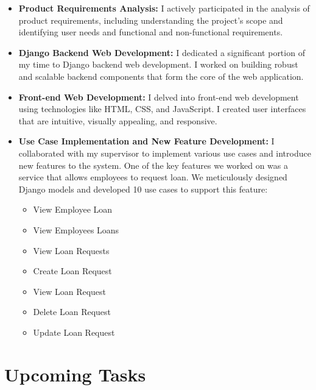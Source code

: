 \documentclass{article}
\begin{document}
\begin{itemize}
    \item \textbf{Product Requirements Analysis:} I actively participated in the analysis of product requirements, including understanding the project's scope and identifying user needs and functional and non-functional requirements.
    
    \item \textbf{Django Backend Web Development:} I dedicated a significant portion of my time to Django backend web development. I worked on building robust and scalable backend components that form the core of the web application.
    
    
    \item \textbf{Front-end Web Development:} I delved into front-end web development using technologies like HTML, CSS, and JavaScript. I created user interfaces that are intuitive, visually appealing, and responsive.
    
    \item \textbf{Use Case Implementation and New Feature Development:} I collaborated with my supervisor to implement various use cases and introduce new features to the system. One of the key features we worked on was a service that allows employees to request loan. We meticulously designed Django models and developed 10 use cases to support this feature:
    
    \begin{itemize}[label=--]
        \item View Employee Loan
        \item View Employees Loans
        \item View Loan Requests
        \item Create Loan Request
        \item View Loan Request
        \item Delete Loan Request
        \item Update Loan Request
    \end{itemize}
    
\end{itemize}

\section{Upcoming Tasks}
\end{document}
